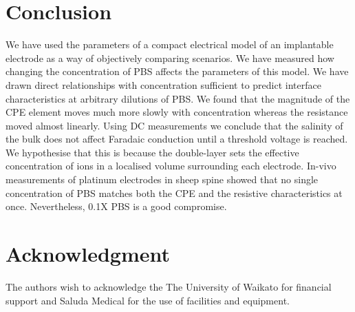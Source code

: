 \documentclass[journal, a4paper]{IEEEtran}
\begin{document}
\section{Conclusion}

We have used the parameters of a compact electrical model of an implantable electrode as a way of objectively comparing scenarios.
We have measured how changing the concentration of PBS affects the parameters of this model.
We have drawn direct relationships with concentration sufficient to predict interface characteristics at arbitrary dilutions of PBS.
We found that the magnitude of the CPE element moves much more slowly with concentration whereas the resistance moved almost linearly.
Using DC measurements we conclude that the salinity of the bulk does not affect Faradaic conduction until a threshold voltage is reached. We hypothesise that this is because the double-layer sets the effective concentration of ions in a localised volume surrounding each electrode. In-vivo measurements of platinum electrodes in sheep spine showed that no single concentration of PBS matches both the CPE and the resistive characteristics at once. Nevertheless, 0.1X PBS is a good compromise.

\section*{Acknowledgment}
The authors wish to acknowledge the The University of Waikato for financial support and Saluda Medical for the use of facilities and equipment.
\end{document}
